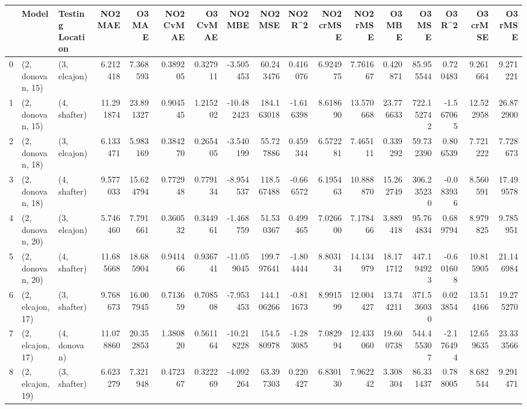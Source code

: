 \begin{tabular}{lllrrrrrrrrrrrrrr}
\toprule
{} &             Model & Testing Location &    NO2 MAE &     O3 MAE &  NO2 CvMAE &  O3 CvMAE &    NO2 MBE &     NO2 MSE &   NO2 R\textasciicircum2 &  NO2 crMSE &   NO2 rMSE &     O3 MBE &       O3 MSE &    O3 R\textasciicircum2 &   O3 crMSE &    O3 rMSE \\
\midrule
0  &  (2, donovan, 15) &     (3, elcajon) &   6.212418 &   7.368593 &   0.389205 &  0.327911 &  -3.505453 &   60.243476 &  0.416076 &   6.924975 &   7.761667 &   0.420871 &    85.955544 &  0.720483 &   9.261664 &   9.271221 \\
1  &  (2, donovan, 15) &     (4, shafter) &  11.291874 &  23.891327 &   0.904545 &  1.215202 & -10.482423 &  184.163018 & -1.616398 &   8.618690 &  13.570668 &  23.776633 &   722.152742 & -1.567065 &  12.522958 &  26.872900 \\
2  &  (2, donovan, 18) &     (3, elcajon) &   6.133471 &   5.983169 &   0.384270 &  0.265405 &  -3.540199 &   55.727886 &  0.459344 &   6.572281 &   7.465111 &   0.339292 &    59.732390 &  0.806539 &   7.721222 &   7.728673 \\
3  &  (2, donovan, 18) &     (4, shafter) &   9.577033 &  15.624794 &   0.772948 &  0.779134 &  -8.954537 &  118.567488 & -0.666572 &   6.195463 &  10.888870 &  15.262749 &   306.235230 & -0.083936 &   8.560591 &  17.499578 \\
4  &  (2, donovan, 20) &     (3, elcajon) &   5.746460 &   7.791661 &   0.360532 &  0.344961 &  -1.468759 &   51.530367 &  0.499465 &   7.026600 &   7.178466 &   3.889418 &    95.764834 &  0.689794 &   8.979825 &   9.785951 \\
5  &  (2, donovan, 20) &     (4, shafter) &  11.685668 &  18.685904 &   0.941466 &  0.936741 & -11.059045 &  199.797641 & -1.804444 &   8.803134 &  14.134979 &  18.171712 &   447.194923 & -0.601608 &  10.815905 &  21.146984 \\
6  &  (2, elcajon, 17) &     (3, shafter) &   9.768673 &  16.007945 &   0.713659 &  0.708508 &  -7.953453 &  144.106266 & -0.811673 &   8.991599 &  12.004427 &  13.744211 &   371.536030 &  0.023854 &  13.514166 &  19.275270 \\
7  &  (2, elcajon, 17) &     (4, donovan) &  11.078860 &  20.352853 &   1.380820 &  0.561164 & -10.218228 &  154.580978 & -1.283085 &   7.082994 &  12.433060 &  19.600738 &   544.455307 & -2.176494 &  12.659635 &  23.333566 \\
8  &  (2, elcajon, 19) &     (3, shafter) &   6.623279 &   7.321948 &   0.472367 &  0.322269 &  -4.092264 &   63.397303 &  0.220427 &   6.830130 &   7.962242 &   3.308304 &    86.331437 &  0.788005 &   8.682544 &   9.291471 \\

\end{tabular}
